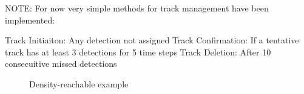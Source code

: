 NOTE: For now very simple methods for track management have been implemented:

Track Initiaiton: Any detection not assigned
Track Confirmation: If a tentative track has at least 3 detections for 5 time steps
Track Deletion: After 10 consecuitive missed detections

\begin{figure}[h!]
	\centering
	
	\caption{Density-reachable example}
\end{figure} 


\begin{figure}
	\centering
	\begin{minipage}{.5\textwidth}
		\centering
	
		\label{fig:test1}
	\end{minipage}%
	\begin{minipage}{.5\textwidth}
		\centering
	
		\label{fig:test2}
	\end{minipage}
\end{figure}